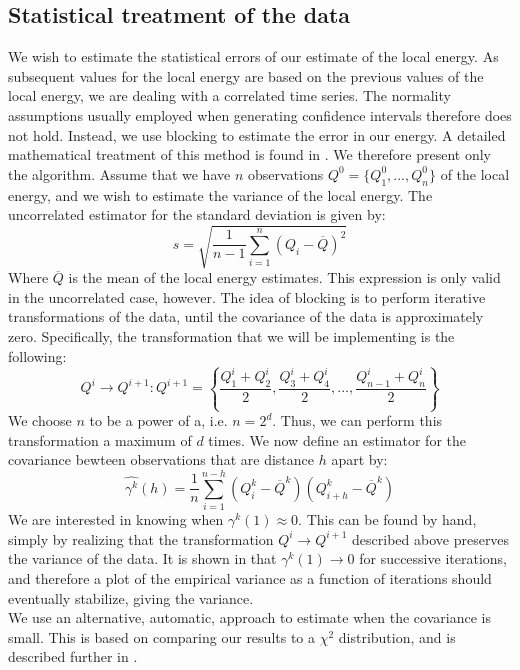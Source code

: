 \documentclass[a4paper, 10pt]{article}
\begin{document}
	\subsection{Statistical treatment of the data}
	We wish to estimate the statistical errors of our estimate of the local energy. As subsequent values for the local energy are based on the previous values of the local energy, we are dealing with a correlated time series. The normality assumptions usually employed when generating confidence intervals therefore does not hold. Instead, we use blocking to estimate the error in our energy. A detailed mathematical treatment of this method is found in \cite{Jonsson2018}. We therefore present only the algorithm. Assume that we have $n$ observations $Q^0=\{Q_1^0,...,Q_n^0\}$ of the local energy, and we wish to estimate the variance of the local energy. The uncorrelated estimator for the standard deviation is given by:
	\begin{equation}
	s=\sqrt{\frac{1}{n-1}\sum_{i=1}^n (Q_i-\overline{Q})^2}
	\end{equation}
	Where $\overline{Q}$ is the mean of the local energy estimates. This expression is only valid in the uncorrelated case, however. The idea of blocking is to perform iterative transformations of the data, until the covariance of the data is approximately zero. Specifically, the transformation that we will be implementing is the following:
	\begin{equation}
	Q^i \rightarrow Q^{i+1}: Q^{i+1} = \left\{ \frac{Q^i_1+Q^i_2}{2}, \frac{Q^i_3+Q^i_4}{2},...,\frac{Q^i_{n-1}+Q^i_{n}}{2}\right\}
	\end{equation}
	We choose $n$ to be a power of a, i.e. $n=2^d$. Thus, we can perform this transformation a maximum of $d$ times. We now define an estimator for the covariance bewteen observations that are distance $h$ apart by:
	\begin{equation}
	\hat{\gamma^k}(h)=\frac{1}{n}\sum_{i=1}^{n-h}(Q_i^k-\overline{Q}^k)(Q_{i+h}^k-\overline{Q}^k)
	\end{equation}
	We are interested in knowing when $\gamma^k(1)\approx 0$. This can be found by hand, simply by realizing that the transformation $Q^i \rightarrow Q^{i+1}$ described above preserves the variance of the data. It is shown in \cite{Jonsson2018} that $\gamma^k(1) \rightarrow 0$ for successive iterations, and therefore a plot of the empirical variance as a function of iterations should eventually stabilize, giving the variance. \\
	\linebreak
	We use an alternative, automatic, approach to estimate when the covariance is small. This is based on comparing our results to a $\chi^2$ distribution, and is described further in \cite{Jonsson2018}.
\end{document}
